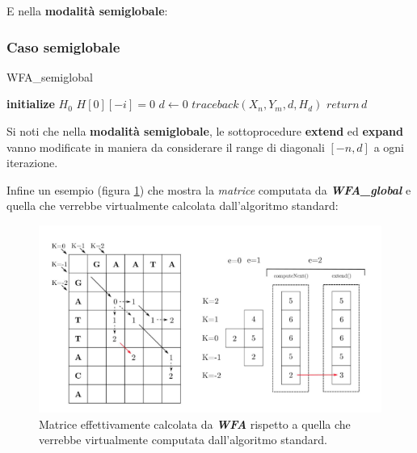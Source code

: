     \vspace{20pt}
    E nella \textbf{modalità semiglobale}:
    
\subsubsection{Caso semiglobale}
    \begin{algorithm}[H]
        \caption{WFA\_semiglobal}
        \label{alg:wfa_semiglobal}
        \textbf{initialize} $H_0$\;
         {
            $H[0][-i] = 0$
        }
        $d \gets 0$\;
        $traceback(X_n, Y_m, d, H_d)$\;
        $return \, d$\;
    \end{algorithm}

    Si noti che nella \textbf{modalità semiglobale}, le sottoprocedure \textbf{extend} ed \textbf{expand} vanno modificate in maniera da considerare il range di diagonali $[-n, d]$ a ogni iterazione.
    \vspace{20pt}

    Infine un esempio (figura \ref{fig:wfa-example}) che mostra la \emph{matrice} computata da \textbf{\textit{WFA\_global}} e quella che verrebbe virtualmente calcolata dall'algoritmo standard:
    
    \begin{figure}[ht]
        \centering
        \includegraphics[width=1\textwidth]{images/wfa_example.png}
        \caption{Matrice effettivamente calcolata da \textbf{\textit{WFA}} rispetto a quella che verrebbe virtualmente computata dall'algoritmo standard. \cite{WFA_edit-distance}}
        \label{fig:wfa-example}
    \end{figure}

